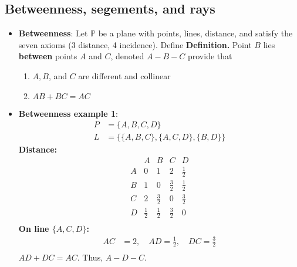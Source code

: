 \documentclass{report}
\begin{document}
    \subsection{Betweenness, segements, and rays}
    \begin{itemize}
        \item \textbf{Betweenness}: Let $\mathbb{P}$ be a plane with points, lines, distance, and satisfy the seven axioms (3 distance, 4 incidence). Define
            \bigbreak \noindent 
            \textbf{Definition.} Point $B$ lies \textbf{between} points $A$ and $C$, denoted $A-B-C$ provide that
            \begin{enumerate}
                \item $A,B$, and $C$ are different and collinear
                \item $AB + BC = AC $
            \end{enumerate}
            \bigbreak \noindent 
            \begin{figure}[ht]
                \centering
                \label{fig:between2}
            \end{figure}
        \item \textbf{Betweenness example 1}: \begin{align*}
                P &= \{A, B, C, D\} \\
                L &= \{\{A, B, C\}, \{A, C, D\}, \{B, D\}\}
            \end{align*}
            \textbf{Distance:}
            \[
                \begin{array}{c|cccc}
  & A & B & C & D \\
  \hline
                    A & 0 & 1 & 2 & \frac{1}{2} \\
                    B & 1 & 0 & \frac{3}{2} & \frac{1}{2} \\
                    C & 2 & \frac{3}{2} & 0 & \frac{3}{2} \\
                    D & \frac{1}{2} & \frac{1}{2} & \frac{3}{2} & 0 \\
                \end{array}
            \]
            \textbf{On line \(\{A, C, D\}\):}
            \begin{align*}
                AC &= 2, \quad AD = \frac{1}{2}, \quad DC = \frac{3}{2} \\
            \end{align*}
            $AD + DC = AC$. Thus, $A - D - C$.
            \bigbreak \noindent 

\end{itemize}
\end{document}
